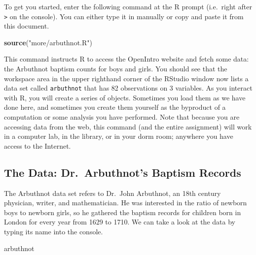 \documentclass[]{article}
\newenvironment{Shaded}{\begin{snugshade}}{\end{snugshade}}
\newcommand{\KeywordTok}[1]{\textcolor[rgb]{0.13,0.29,0.53}{\textbf{#1}}}
\newcommand{\StringTok}[1]{\textcolor[rgb]{0.31,0.60,0.02}{#1}}
\newcommand{\NormalTok}[1]{#1}
\begin{document}
To get you started, enter the following command at the R prompt
(i.e.~right after \texttt{\textgreater{}} on the console). You can
either type it in manually or copy and paste it from this document.

\begin{Shaded}
\begin{Highlighting}[]
\KeywordTok{source}\NormalTok{(}\StringTok{"more/arbuthnot.R"}\NormalTok{)}
\end{Highlighting}
\end{Shaded}

This command instructs R to access the OpenIntro website and fetch some
data: the Arbuthnot baptism counts for boys and girls. You should see
that the workspace area in the upper righthand corner of the RStudio
window now lists a data set called \texttt{arbuthnot} that has 82
observations on 3 variables. As you interact with R, you will create a
series of objects. Sometimes you load them as we have done here, and
sometimes you create them yourself as the byproduct of a computation or
some analysis you have performed. Note that because you are accessing
data from the web, this command (and the entire assignment) will work in
a computer lab, in the library, or in your dorm room; anywhere you have
access to the Internet.

\subsection{The Data: Dr.~Arbuthnot's Baptism
Records}\label{the-data-dr.arbuthnots-baptism-records}

The Arbuthnot data set refers to Dr.~John Arbuthnot, an 18th century
physician, writer, and mathematician. He was interested in the ratio of
newborn boys to newborn girls, so he gathered the baptism records for
children born in London for every year from 1629 to 1710. We can take a
look at the data by typing its name into the console.

\begin{Shaded}
\begin{Highlighting}[]
\NormalTok{arbuthnot}
\end{Highlighting}
\end{Shaded}
\end{document}
